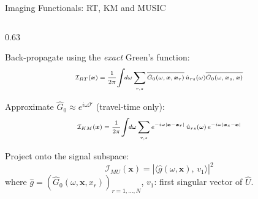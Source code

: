 \documentclass{beamer}
\begin{document}
\begin{frame}{Imaging Functionals: RT, KM and MUSIC}
  \small

  \hspace*{-0.45cm}
  \begin{minipage}{\dimexpr\textwidth+0.7cm\relax}
  \setlength{\columnsep}{0.5pt}
  \begin{columns}[T]
  \begin{column}{0.63\textwidth}
    \begin{tcolorbox}[keybox, title=Reverse-Time (RT) Migration, top=2pt, bottom=2pt]
      \footnotesize
      Back-propagate using the \emph{exact} Green's function:
      \vspace{-0.22cm} 
      \begin{equation*}
        \scriptsize
        \begin{aligned}
          \mathcal{I}_{RT}(\bm{x}) = \frac{1}{2\pi}\!\int\!\! d\omega \sum_{r,s} \overline{\hat{G}_0(\omega, \bm{x}, \bm{x}_r)}\,\hat{u}_{rs}(\omega) \overline{\hat{G}_0(\omega, \bm{x}_s, \bm{x})}
        \end{aligned}
      \end{equation*}
    \end{tcolorbox}

    \begin{tcolorbox}[warnbox, title=Kirchhoff Migration (KM), top=2pt, bottom=1pt]
      \footnotesize
      Approximate $\hat{G}_0 \approx e^{i\omega\mathcal{T}}$ (travel-time only):
      \vspace{-0.22cm}
      \begin{equation*}
        \scriptsize
        \begin{aligned}
          \mathcal{I}_{KM}(\bm{x}) = \frac{1}{2\pi}\!\int\!\! d\omega \sum_{r,s} e^{-i\omega|\bm{x}-\bm{x}_r|}\,\hat{u}_{rs}(\omega)\,e^{-i\omega|\bm{x}_s - \bm{x}|}
        \end{aligned}
      \end{equation*}
    \end{tcolorbox}

    \begin{tcolorbox}[resultbox, title=MUSIC (Signal-Subspace Projection), top=1pt, bottom=2pt]
      \footnotesize
      Project onto the signal subspace:
      \vspace{-0.15cm}
      {\scriptsize\[\mathcal{I}_{MU}(\bm{x}) = |\langle \hat{g}(\omega, \bm{x}),\, v_1 \rangle|^2\]\vspace{-0.5em}}
      {\scriptsize where $\hat{g} = (\hat{G}_0(\omega, \bm{x}, x_r))_{r=1,\dots,N}$, $v_1$: first singular vector of $\hat{U}$.}
    \end{tcolorbox}
  \end{column}


\end{columns}
\end{minipage}
\end{frame}
\end{document}
